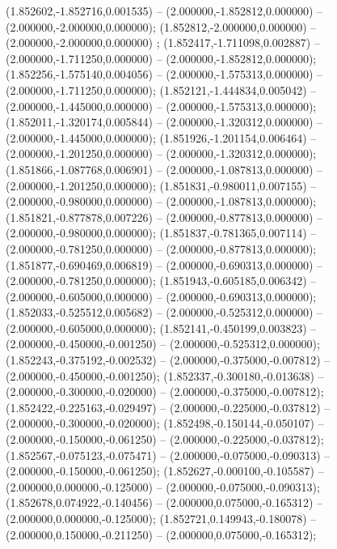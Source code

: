  (1.852602,-1.852716,0.001535) -- (2.000000,-1.852812,0.000000) -- (2.000000,-2.000000,0.000000);
 (1.852812,-2.000000,0.000000) -- (2.000000,-2.000000,0.000000) ;
 (1.852417,-1.711098,0.002887) -- (2.000000,-1.711250,0.000000) -- (2.000000,-1.852812,0.000000);
 (1.852256,-1.575140,0.004056) -- (2.000000,-1.575313,0.000000) -- (2.000000,-1.711250,0.000000);
 (1.852121,-1.444834,0.005042) -- (2.000000,-1.445000,0.000000) -- (2.000000,-1.575313,0.000000);
 (1.852011,-1.320174,0.005844) -- (2.000000,-1.320312,0.000000) -- (2.000000,-1.445000,0.000000);
 (1.851926,-1.201154,0.006464) -- (2.000000,-1.201250,0.000000) -- (2.000000,-1.320312,0.000000);
 (1.851866,-1.087768,0.006901) -- (2.000000,-1.087813,0.000000) -- (2.000000,-1.201250,0.000000);
 (1.851831,-0.980011,0.007155) -- (2.000000,-0.980000,0.000000) -- (2.000000,-1.087813,0.000000);
 (1.851821,-0.877878,0.007226) -- (2.000000,-0.877813,0.000000) -- (2.000000,-0.980000,0.000000);
 (1.851837,-0.781365,0.007114) -- (2.000000,-0.781250,0.000000) -- (2.000000,-0.877813,0.000000);
 (1.851877,-0.690469,0.006819) -- (2.000000,-0.690313,0.000000) -- (2.000000,-0.781250,0.000000);
 (1.851943,-0.605185,0.006342) -- (2.000000,-0.605000,0.000000) -- (2.000000,-0.690313,0.000000);
 (1.852033,-0.525512,0.005682) -- (2.000000,-0.525312,0.000000) -- (2.000000,-0.605000,0.000000);
 (1.852141,-0.450199,0.003823) -- (2.000000,-0.450000,-0.001250) -- (2.000000,-0.525312,0.000000);
 (1.852243,-0.375192,-0.002532) -- (2.000000,-0.375000,-0.007812) -- (2.000000,-0.450000,-0.001250);
 (1.852337,-0.300180,-0.013638) -- (2.000000,-0.300000,-0.020000) -- (2.000000,-0.375000,-0.007812);
 (1.852422,-0.225163,-0.029497) -- (2.000000,-0.225000,-0.037812) -- (2.000000,-0.300000,-0.020000);
 (1.852498,-0.150144,-0.050107) -- (2.000000,-0.150000,-0.061250) -- (2.000000,-0.225000,-0.037812);
 (1.852567,-0.075123,-0.075471) -- (2.000000,-0.075000,-0.090313) -- (2.000000,-0.150000,-0.061250);
 (1.852627,-0.000100,-0.105587) -- (2.000000,0.000000,-0.125000) -- (2.000000,-0.075000,-0.090313);
 (1.852678,0.074922,-0.140456) -- (2.000000,0.075000,-0.165312) -- (2.000000,0.000000,-0.125000);
 (1.852721,0.149943,-0.180078) -- (2.000000,0.150000,-0.211250) -- (2.000000,0.075000,-0.165312);

